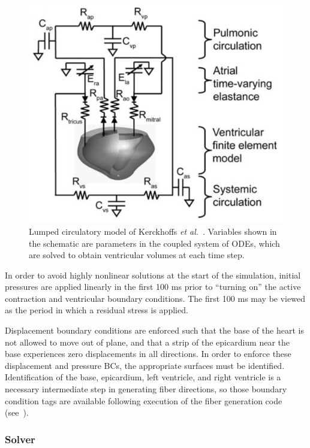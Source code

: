 \begin{figure}[ht]
\centering
		\includegraphics[scale=0.3]{media/bcs.png}
\caption{Lumped circulatory model of Kerckhoffs \textit{et al.}~\cite{kerckhoffs_2006}. Variables shown in the schematic are parameters in the coupled system of ODEs, which are solved to obtain ventricular volumes at each time step.}
\label{fig:bcs}
\end{figure}

In order to avoid highly nonlinear solutions at the start of the simulation, initial pressures are applied linearly in the first 100 ms prior to ``turning on'' the active contraction and ventricular boundary conditions. The first 100 ms may be viewed as the period in which a residual stress is applied.

Displacement boundary conditions are enforced such that the base of the heart is not allowed to move out of plane, and that a strip of the epicardium near the base experiences zero displacements in all directions. In order to enforce these displacement and pressure BCs, the appropriate surfaces must be identified. Identification of the base, epicardium, left ventricle, and right ventricle is a necessary intermediate step in generating fiber directions, so those boundary condition tags are available following execution of the fiber generation code (see~).

\subsubsection{Solver}
\label{Solver}

